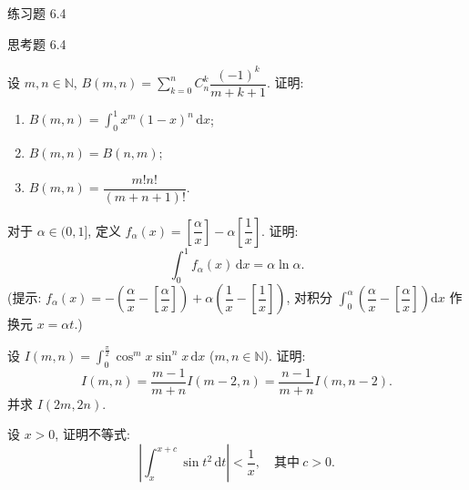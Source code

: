 \begin{exblock}{练习题 6.4}
\end{exblock}

\begin{exblock}{思考题 6.4}

  \item 设 $m,n\in\mathbb{N}$, $B(m,n)=\sum\limits_{k=0}^{n}C_{n}^{k}\dfrac{(-1)^{k}}{m+k+1}$. 证明:
  \begin{enumerate}[label=(\arabic*)]
    \item $B(m,n)=\int_{0}^{1}x^{m}(1-x)^{n}\,\mathrm{d}x$;
    \item $B(m,n)=B(n,m)$;
    \item $B(m,n)=\dfrac{m!n!}{(m+n+1)!}$.
  \end{enumerate}

  \item 对于 $\alpha\in(0,1]$, 定义 $f_{\alpha}(x)=\left[\dfrac{\alpha}{x}\right]-\alpha\left[\dfrac{1}{x}\right]$. 证明:
  \[
  \int_{0}^{1}f_{\alpha}(x)\,\mathrm{d}x=\alpha\ln\alpha.
\]
  (提示: $f_{\alpha}(x)=-\left(\dfrac{\alpha}{x}-\left[\dfrac{\alpha}{x}\right]\right)+\alpha\left(\dfrac{1}{x}-\left[\dfrac{1}{x}\right]\right)$, 对积分 $\int_{0}^{\alpha}\left(\dfrac{\alpha}{x}-\left[\dfrac{\alpha}{x}\right]\right)\mathrm{d}x$ 作换元 $x=\alpha t$.)

  \item 设 $I(m,n)=\int_{0}^{\frac{\pi}{2}}\cos^{m}x\sin^{n}x\,\mathrm{d}x$ ($m,n\in\mathbb{N}$). 证明:
  \[
  I(m,n)=\frac{m-1}{m+n}I(m-2,n)=\frac{n-1}{m+n}I(m,n-2).
\]
  并求 $I(2m,2n)$.

  \item 设 $x>0$, 证明不等式:
  \[
  \left|\int_{x}^{x+c}\sin t^{2}\,\mathrm{d}t\right|<\frac{1}{x},\quad\text{其中}\ c>0.
\]

\end{exblock}
